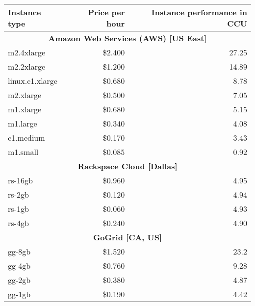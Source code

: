 \begin{table}
  \centering
  \begin{tabular}{| l | r | r |}
    \hline
    \textbf{Instance type} & \textbf{Price per hour} & \textbf{Instance performance in CCU} \\ \hline
    \multicolumn{3}{|c|}{\textbf{Amazon Web Services (AWS) [US East]}}       \\ \hline
    m2.4xlarge        & \$2.400   & 27.25                                    \\ \hline
    m2.2xlarge        & \$1.200   & 14.89                                    \\ \hline
    linux.c1.xlarge   & \$0.680   & 8.78                                     \\ \hline
    m2.xlarge         & \$0.500   & 7.05                                     \\ \hline
    m1.xlarge         & \$0.680   & 5.15                                     \\ \hline
    m1.large          & \$0.340   & 4.08                                     \\ \hline
    c1.medium         & \$0.170   & 3.43                                     \\ \hline
    m1.small          & \$0.085   & 0.92                                     \\ \hline
    \multicolumn{3}{|c|}{\textbf{Rackspace Cloud [Dallas]}}                  \\ \hline
    rs-16gb           & \$0.960   & 4.95                                     \\ \hline
    rs-2gb            & \$0.120   & 4.94                                     \\ \hline
    rs-1gb            & \$0.060   & 4.93                                     \\ \hline
    rs-4gb            & \$0.240   & 4.90                                     \\ \hline
    \multicolumn{3}{|c|}{\textbf{GoGrid [CA, US]}}                           \\ \hline
    gg-8gb            & \$1.520   & 23.2                                     \\ \hline
    gg-4gb            & \$0.760   & 9.28                                     \\ \hline
    gg-2gb            & \$0.380   & 4.87                                     \\ \hline
    gg-1gb            & \$0.190   & 4.42                                     \\ \hline

\end{tabular}
\end{table}
